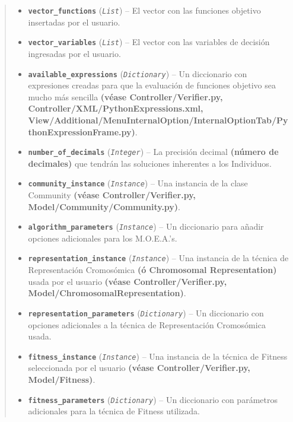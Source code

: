 \documentclass[letterpaper,10pt,english]{sphinxmanual}
\begin{document}
\begin{fulllineitems}
\begin{quote}
\begin{description}
\begin{itemize}
\item {} 
\textbf{\texttt{vector\_functions}} (\emph{\texttt{List}}) -- El vector con las funciones objetivo insertadas por el usuario.

\item {} 
\textbf{\texttt{vector\_variables}} (\emph{\texttt{List}}) -- El vector con las variables de decisión ingresadas por el usuario.

\item {} 
\textbf{\texttt{available\_expressions}} (\emph{\texttt{Dictionary}}) -- Un diccionario con expresiones creadas para que la evaluación de funciones objetivo sea mucho más sencilla
\textbf{(véase Controller/Verifier.py, Controller/XML/PythonExpressions.xml, View/Additional/MenuInternalOption/InternalOptionTab/PythonExpressionFrame.py)}.

\item {} 
\textbf{\texttt{number\_of\_decimals}} (\emph{\texttt{Integer}}) -- La precisión decimal \textbf{(número de decimales)} que tendrán las soluciones inherentes a los Individuos.

\item {} 
\textbf{\texttt{community\_instance}} (\emph{\texttt{Instance}}) -- Una instancia de la clase Community
\textbf{(véase Controller/Verifier.py, Model/Community/Community.py)}.

\item {} 
\textbf{\texttt{algorithm\_parameters}} (\emph{\texttt{Instance}}) -- Un diccionario para añadir opciones adicionales para los M.O.E.A.'s.

\item {} 
\textbf{\texttt{representation\_instance}} (\emph{\texttt{Instance}}) -- Una instancia de la técnica de Representación Cromosómica \textbf{(ó Chromosomal Representation)} usada
por el usuario \textbf{(véase Controller/Verifier.py, Model/ChromosomalRepresentation)}.

\item {} 
\textbf{\texttt{representation\_parameters}} (\emph{\texttt{Dictionary}}) -- Un diccionario con opciones adicionales a la técnica de Representación Cromosómica usada.

\item {} 
\textbf{\texttt{fitness\_instance}} (\emph{\texttt{Instance}}) -- Una instancia de la técnica de Fitness seleccionada por el usuario
\textbf{(véase Controller/Verifier.py, Model/Fitness)}.

\item {} 
\textbf{\texttt{fitness\_parameters}} (\emph{\texttt{Dictionary}}) -- Un diccionario con parámetros adicionales para la técnica de Fitness utilizada.


\end{itemize}
\end{description}
\end{quote}
\end{fulllineitems}
\end{document}
